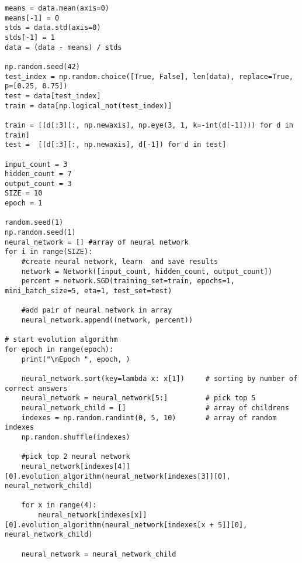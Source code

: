 \begin{lstlisting}
means = data.mean(axis=0)
means[-1] = 0 
stds = data.std(axis=0)
stds[-1] = 1
data = (data - means) / stds

np.random.seed(42)
test_index = np.random.choice([True, False], len(data), replace=True, p=[0.25, 0.75])
test = data[test_index]
train = data[np.logical_not(test_index)]

train = [(d[:3][:, np.newaxis], np.eye(3, 1, k=-int(d[-1]))) for d in train]
test =  [(d[:3][:, np.newaxis], d[-1]) for d in test]

input_count = 3
hidden_count = 7
output_count = 3
SIZE = 10
epoch = 1

random.seed(1)
np.random.seed(1)
neural_network = [] #array of neural network
for i in range(SIZE):
    #create neural network, learn  and save results
    network = Network([input_count, hidden_count, output_count])  
    percent = network.SGD(training_set=train, epochs=1, mini_batch_size=5, eta=1, test_set=test)
    
    #add pair of neural network in array
    neural_network.append((network, percent))

# start evolution algorithm 
for epoch in range(epoch):
    print("\nEpoch ", epoch, )
    
    neural_network.sort(key=lambda x: x[1])     # sorting by number of correct answers
    neural_network = neural_network[5:]         # pick top 5
    neural_network_child = []                   # array of childrens
    indexes = np.random.randint(0, 5, 10)       # array of random indexes
    np.random.shuffle(indexes)
    
    #pick top 2 neural network
    neural_network[indexes[4]][0].evolution_algorithm(neural_network[indexes[3]][0], neural_network_child)
    
    for x in range(4):
        neural_network[indexes[x]][0].evolution_algorithm(neural_network[indexes[x + 5]][0], neural_network_child)

    neural_network = neural_network_child
\end{lstlisting}